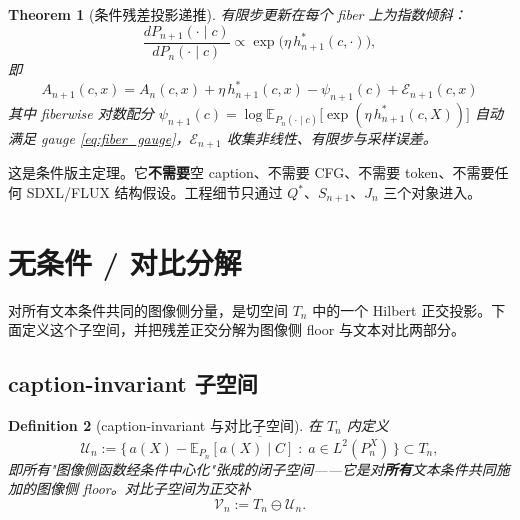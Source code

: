 \documentclass[11pt,a4paper]{article}
\newtheorem{theorem}{Theorem}[section]
\newtheorem{definition}[theorem]{Definition}
\newcommand{\E}{\mathbb{E}}
\newcommand{\cE}{\mathcal{E}}
\newcommand{\cU}{\mathcal{U}}
\newcommand{\cV}{\mathcal{V}}
\begin{document}
\begin{theorem}[条件残差投影递推]\label{thm:cond_recursion}
有限步更新在每个 fiber 上为指数倾斜：
\begin{equation}\label{eq:cond_update}
\frac{dP_{n+1}(\cdot\mid c)}{dP_n(\cdot\mid c)} \propto \exp\!\bigl(\eta\, h^*_{n+1}(c,\cdot)\bigr),
\end{equation}
即
\begin{equation}\label{eq:cond_A_recursion}
\boxed{
A_{n+1}(c,x) = A_n(c,x) + \eta\, h^*_{n+1}(c,x) - \psi_{n+1}(c) + \cE_{n+1}(c,x)
}
\end{equation}
其中 fiberwise 对数配分 $\psi_{n+1}(c) = \log \E_{P_n(\cdot\mid c)}\!\bigl[\exp(\eta\,h^*_{n+1}(c,X))\bigr]$ 自动满足 gauge \eqref{eq:fiber_gauge}，$\cE_{n+1}$ 收集非线性、有限步与采样误差。
\end{theorem}

\noindent 这是条件版主定理。它\textbf{不需要}空 caption、不需要 CFG、不需要 token、不需要任何 SDXL/FLUX 结构假设。工程细节只通过 $Q^*$、$S_{n+1}$、$J_n$ 三个对象进入。

\section{无条件 / 对比分解}
\label{sec:uc_projection}

对所有文本条件共同的图像侧分量，是切空间 $T_n$ 中的一个 Hilbert 正交投影。下面定义这个子空间，并把残差正交分解为图像侧 floor 与文本对比两部分。

\subsection{caption-invariant 子空间}

\begin{definition}[caption-invariant 与对比子空间]
在 $T_n$ 内定义
\begin{equation}\label{eq:U_subspace}
\cU_n := \overline{\bigl\{\, a(X) - \E_{P_n}[a(X)\mid C] \;:\; a\in L^2(P_n^X) \,\bigr\}} \subset T_n,
\end{equation}
即所有"图像侧函数经条件中心化"张成的闭子空间——它是对\textbf{所有}文本条件共同施加的图像侧 floor。对比子空间为正交补
\begin{equation}\label{eq:V_subspace}
\cV_n := T_n \ominus \cU_n.
\end{equation}
\end{definition}
\end{document}
